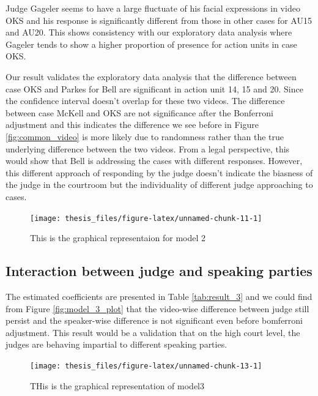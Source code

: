 \documentclass{monashthesis}
\begin{document}
Judge Gageler seems to have a large fluctuate of his facial expressions in video OKS and his response is significantly different from those in other cases for AU15 and AU20. This shows consistency with our exploratory data analysis where Gageler tends to show a higher proportion of presence for action units in case OKS.

Our result validates the exploratory data analysis that the difference between case OKS and Parkes for Bell are significant in action unit 14, 15 and 20. Since the confidence interval doesn't overlap for these two videos. The difference between case McKell and OKS are not significance after the Bonferroni adjustment and this indicates the difference we see before in Figure \ref{fig:common_video} is more likely due to randomness rather than the true underlying difference between the two videos. From a legal perspective, this would show that Bell is addressing the cases with different responses. However, this different approach of responding by the judge doesn't indicate the biasness of the judge in the courtroom but the individuality of different judge approaching to cases.

\begin{figure}
\texttt{[image: thesis\_files/figure-latex/unnamed-chunk-11-1]} \caption{This is the graphical representaion for model 2\label{fig:model_2_plot}}\label{fig:unnamed-chunk-11}
\end{figure}

\hypertarget{interaction-between-judge-and-speaking-parties}{%
\subsection{Interaction between judge and speaking parties}\label{interaction-between-judge-and-speaking-parties}}

The estimated coefficients are presented in Table \ref{tab:result_3} and we could find from Figure \ref{fig:model_3_plot} that the video-wise difference between judge still persist and the speaker-wise difference is not significant even before bomferroni adjustment. This result would be a validation that on the high court level, the judges are behaving impartial to different speaking parties.

\begin{figure}
\texttt{[image: thesis\_files/figure-latex/unnamed-chunk-13-1]} \caption{THis is the graphical representation of model3\label{fig:model_3_plot}}\label{fig:unnamed-chunk-13}
\end{figure}
\end{document}
